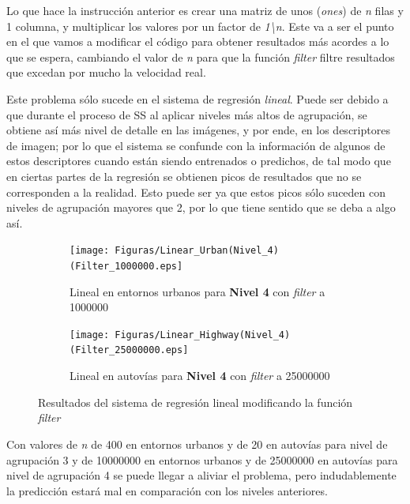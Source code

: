 Lo que hace la instrucción anterior es crear una matriz de unos (\textit{ones}) de \textit{n} filas y 1 columna, y multiplicar los valores por un factor de \textit{1\textbackslash{n}}. Este va a ser el punto en el que vamos a modificar el código para obtener resultados más acordes a lo que se espera, cambiando el valor de \textit{n} para que la función \textit{filter} filtre resultados que excedan por mucho la velocidad real.

Este problema sólo sucede en el sistema de regresión \textit{lineal}. Puede ser debido a que durante el proceso de \ac{SS} al aplicar niveles más altos de agrupación, se obtiene así más nivel de detalle en las imágenes, y por ende, en los descriptores de imagen; por lo que el sistema se confunde con la información de algunos de estos descriptores cuando están siendo entrenados o predichos, de tal modo que en ciertas partes de la regresión se obtienen picos de resultados que no se corresponden a la realidad. Esto puede ser ya que estos picos sólo suceden con niveles de agrupación mayores que 2, por lo que tiene sentido que se deba a algo así.

\begin{figure}[H]
\centering
  \begin{subfigure}[b]{0.45\linewidth}
    \texttt{[image: Figuras/Linear\_Urban(Nivel\_4)(Filter\_1000000.eps]}
    \caption{Lineal en entornos urbanos para \textbf{Nivel 4} con \textit{filter} a 1000000}
  \end{subfigure}
  \begin{subfigure}[b]{0.45\linewidth}
    \texttt{[image: Figuras/Linear\_Highway(Nivel\_4)(Filter\_25000000.eps]}
    \caption{Lineal en autovías para \textbf{Nivel 4} con \textit{filter} a 25000000}
  \end{subfigure}
  \caption{Resultados del sistema de regresión lineal modificando la función \textit{filter}}
\end{figure}

Con valores de \textit{n} de 400 en entornos urbanos y de 20 en autovías para nivel de agrupación 3 y de 10000000 en entornos urbanos y de 25000000 en autovías para nivel de agrupación 4 se puede llegar a aliviar el problema, pero indudablemente la predicción estará mal en comparación con los niveles anteriores.


